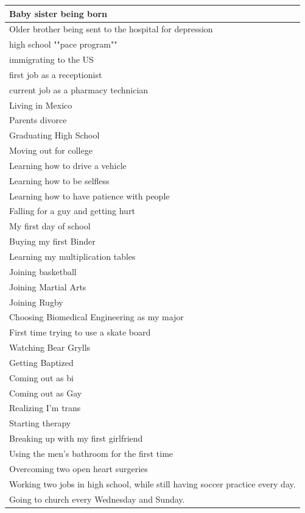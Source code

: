\documentclass[
  .7em,
  letterpaper,
  DIV=11,
  numbers=noendperiod]{scrartcl}
\begin{document}
\begin{table}
\begin{tabular}{l}
\hline
Baby sister being born\\
\hline
Older brother being sent to the hospital for depression\\
\hline
high school ""pace program""\\
\hline
immigrating to the US\\
\hline
first job as a receptionist\\
\hline
current job as a pharmacy technician\\
\hline
Living in Mexico\\
\hline
Parents divorce\\
\hline
Graduating High School\\
\hline
Moving out for college\\
\hline
Learning how to drive a vehicle\\
\hline
Learning how to be selfless\\
\hline
Learning how to have patience with people\\
\hline
Falling for a guy and getting hurt\\
\hline
My first day of school\\
\hline
Buying my first Binder\\
\hline
Learning my multiplication tables\\
\hline
Joining basketball\\
\hline
Joining Martial Arts\\
\hline
Joining Rugby\\
\hline
Choosing Biomedical Engineering as my major\\
\hline
First time trying to use a skate board\\
\hline
Watching Bear Grylls\\
\hline
Getting Baptized\\
\hline
Coming out as bi\\
\hline
Coming out as Gay\\
\hline
Realizing I'm trans\\
\hline
Starting therapy\\
\hline
Breaking up with my first girlfriend\\
\hline
Using the men's bathroom for the first time\\
\hline
Overcoming two open heart surgeries\\
\hline
Working two jobs in high school, while still having soccer practice every day.\\
\hline
Going to church every Wednesday and Sunday.\\
\hline

\end{tabular}
\end{table}
\end{document}
